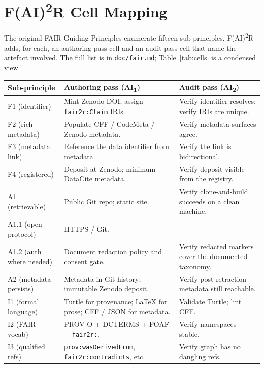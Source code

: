 \section{F(AI)\texorpdfstring{\textsuperscript{2}}{2}R Cell Mapping}
\label{sec:appendix-cell-mapping}
\label{app:fair-cells}

The original FAIR Guiding Principles enumerate fifteen sub-principles.
F(AI)\textsuperscript{2}R adds, for each, an authoring-pass cell and
an audit-pass cell that name the artefact involved. The full list is
in \texttt{doc/fair.md}; Table~\ref{tab:cells} is a condensed view.

\begin{table}[!ht]
\centering
\small
\begin{tabular}{lp{4.6cm}p{4.6cm}}
\toprule
\textbf{Sub-principle} & \textbf{Authoring pass (AI\textsubscript{1})} & \textbf{Audit pass (AI\textsubscript{2})} \\
\midrule
F1 (identifier)       & Mint Zenodo DOI; assign \texttt{fair2r:Claim} IRIs. & Verify identifier resolves; verify IRIs are unique. \\
F2 (rich metadata)    & Populate CFF / CodeMeta / Zenodo metadata. & Verify metadata surfaces agree. \\
F3 (metadata link)    & Reference the data identifier from metadata. & Verify the link is bidirectional. \\
F4 (registered)       & Deposit at Zenodo; minimum DataCite metadata. & Verify deposit visible from the registry. \\
A1 (retrievable)      & Public Git repo; static site. & Verify clone-and-build succeeds on a clean machine. \\
A1.1 (open protocol)  & HTTPS / Git. & --- \\
A1.2 (auth where needed) & Document redaction policy and consent gate. & Verify redacted markers cover the documented taxonomy. \\
A2 (metadata persists) & Metadata in Git history; immutable Zenodo deposit. & Verify post-retraction metadata still reachable. \\
I1 (formal language)  & Turtle for provenance; \LaTeX{} for prose; CFF / JSON for metadata. & Validate Turtle; lint CFF. \\
I2 (FAIR vocab)       & PROV-O + DCTERMS + FOAF + \texttt{fair2r:}. & Verify namespaces stable. \\
I3 (qualified refs)   & \texttt{prov:wasDerivedFrom}, \texttt{fair2r:contradicts}, etc. & Verify graph has no dangling refs. \\

\end{tabular}
\end{table}
